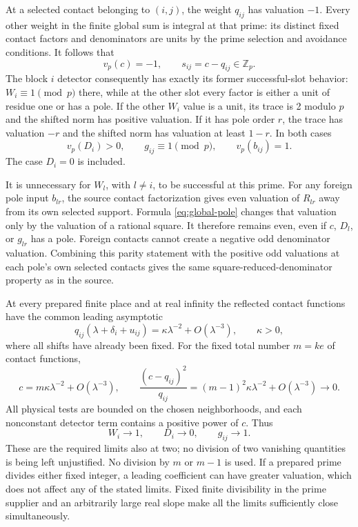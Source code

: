 \documentclass[11pt]{article}
\begin{document}
At a selected contact belonging to \((i,j)\),
the weight \(q_{ij}\) has valuation \(-1\).
Every other weight in the finite global
sum is integral at that prime: its
distinct fixed contact factors and
denominators are units by the prime
selection and avoidance conditions.
It follows that
\[
                    v_p(c)=-1,\qquad
                    s_{ij}=c-q_{ij}\in\mathbb Z_p .
\]
The block \(i\) detector consequently has
exactly its former successful-slot
behavior: \(W_i\equiv1\pmod p\) there,
while at the other slot every factor
is either a unit of residue one or
has a pole. If the other \(W_i\) value
is a unit, its trace is 2 modulo \(p\)
and the shifted norm has positive
valuation. If it has pole order \(r\),
the trace has valuation \(-r\) and the
shifted norm has valuation at least
\(1-r\). In both cases
\[
                  v_p(D_i)>0,\qquad
                  g_{ij}\equiv1\pmod p,\qquad
                  v_p(b_{ij})=1 .
\]
The case \(D_i=0\) is included.

It is unnecessary for \(W_l\), with \(l\ne i\),
to be successful at this prime. For any
foreign pole input \(b_{lr}\), the source
contact factorization gives even valuation
of \(R_{lr}\) away from its own selected
support. Formula \eqref{eq:global-pole}
changes that valuation only by the
valuation of a rational square. It
therefore remains even, even if \(c\),
\(D_l\), or \(g_{lr}\) has a pole.
Foreign contacts cannot create a negative
odd denominator valuation. Combining
this parity statement with the positive
odd valuations at each pole's own
selected contacts gives the same
square-reduced-denominator property
as in the source.

At every prepared finite place and at
real infinity the reflected contact
functions have the common leading
asymptotic
\[
 q_{ij}(\lambda+\delta_i+u_{ij})
             =\kappa\lambda^{-2}+O(\lambda^{-3}),
                         \qquad\kappa>0,
\]
where all shifts have already been fixed.
For the fixed total number \(m=ke\)
of contact functions,
\[
 c=m\kappa\lambda^{-2}+O(\lambda^{-3}),\qquad
 \frac{(c-q_{ij})^2}{q_{ij}}
       =(m-1)^2\kappa\lambda^{-2}+O(\lambda^{-3})
       \longrightarrow0 .
\]
All physical tests are bounded on the
chosen neighborhoods, and each nonconstant
detector term contains a positive power
of \(c\). Thus
\[
          W_i\longrightarrow1,\qquad
          D_i\longrightarrow0,\qquad
          g_{ij}\longrightarrow1 .
\]
These are the required limits also at
two; no division of two vanishing
quantities is being left unjustified.
No division by \(m\) or \(m-1\) is used.
If a prepared prime divides either fixed
integer, a leading coefficient can have
greater valuation, which does not affect
any of the stated limits.
Fixed finite divisibility in the prime
supplier and an arbitrarily large real
slope make all the limits sufficiently
close simultaneously.
\end{document}
